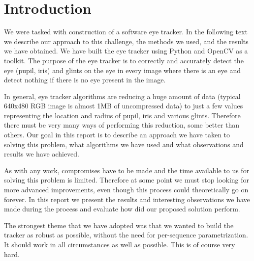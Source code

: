\section{Introduction}

We were tasked with construction of a software eye tracker. In the following text we describe our approach to this challenge, the methods we used, and the results we have obtained.  We have built the eye tracker using Python and OpenCV as a toolkit. The purpose of the eye tracker is to correctly and accurately detect the eye (pupil, iris) and glints on the eye in every image where there is an eye and detect nothing if there is no eye present in the image.

In general, eye tracker algorithms are reducing a huge amount of data (typical 640x480 RGB image is almost 1MB of uncompressed data) to just a few values representing the location and radius of pupil, iris and various glints. Therefore there must be very many ways of performing this reduction, some better than others. Our goal in this report is to describe an approach we have taken to solving this problem, what algorithms we have used and what observations and results we have achieved.

As with any work, compromises have to be made and the time available to us for solving this problem is limited. Therefore at some point we must stop looking for more advanced improvements, even though this process could theoretically go on forever. In this report we present the results and interesting observations we have made during the process and evaluate how did our proposed solution perform.

The strongest theme that we have adopted was that we wanted to build the tracker as robust as possible, without the need for per-sequence parametrization. It should work in all circumstances as well as possible. This is of course very hard.

